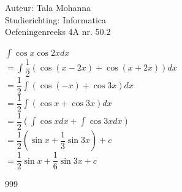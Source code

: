 \documentclass[a4paper]{article}
\newcommand{\dint}{\displaystyle\int}
\begin{document}
\noindent \large Auteur: Tala Mohanna\\
\noindent \large Studierichting: Informatica\\
\noindent \large Oefeningenreeks 4A nr. 50.2\\

\medskip

$ \dint \cos x \cos 2x dx $\\

$ = \dint \dfrac{1}{2} (\cos(x-2x)+\cos(x+2x)) dx $\\

$ = \dfrac{1}{2} \dint (\cos(-x)+\cos 3x) dx $\\

$ = \dfrac{1}{2} \dint (\cos x+\cos 3x) dx $\\

$ = \dfrac{1}{2} \left( \dint \cos x dx+\dint \cos 3x dx \right) $\\

$ = \dfrac{1}{2} \left( \sin x+\dfrac{1}{3}\sin 3x \right)+c $\\

$ = \dfrac{1}{2}\sin x+\dfrac{1}{6}\sin 3x+c $

\begin{thebibliography}{999}
\end{thebibliography}
\end{document}
